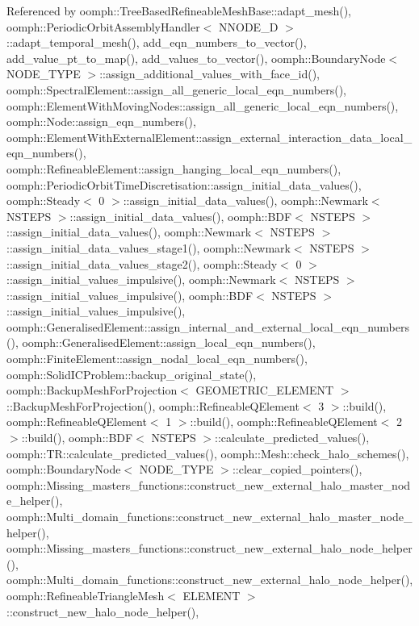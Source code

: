 Referenced by oomph\+::\+Tree\+Based\+Refineable\+Mesh\+Base\+::adapt\+\_\+mesh(), oomph\+::\+Periodic\+Orbit\+Assembly\+Handler$<$ N\+N\+O\+D\+E\+\_\+D $>$\+::adapt\+\_\+temporal\+\_\+mesh(), add\+\_\+eqn\+\_\+numbers\+\_\+to\+\_\+vector(), add\+\_\+value\+\_\+pt\+\_\+to\+\_\+map(), add\+\_\+values\+\_\+to\+\_\+vector(), oomph\+::\+Boundary\+Node$<$ N\+O\+D\+E\+\_\+\+T\+Y\+P\+E $>$\+::assign\+\_\+additional\+\_\+values\+\_\+with\+\_\+face\+\_\+id(), oomph\+::\+Spectral\+Element\+::assign\+\_\+all\+\_\+generic\+\_\+local\+\_\+eqn\+\_\+numbers(), oomph\+::\+Element\+With\+Moving\+Nodes\+::assign\+\_\+all\+\_\+generic\+\_\+local\+\_\+eqn\+\_\+numbers(), oomph\+::\+Node\+::assign\+\_\+eqn\+\_\+numbers(), oomph\+::\+Element\+With\+External\+Element\+::assign\+\_\+external\+\_\+interaction\+\_\+data\+\_\+local\+\_\+eqn\+\_\+numbers(), oomph\+::\+Refineable\+Element\+::assign\+\_\+hanging\+\_\+local\+\_\+eqn\+\_\+numbers(), oomph\+::\+Periodic\+Orbit\+Time\+Discretisation\+::assign\+\_\+initial\+\_\+data\+\_\+values(), oomph\+::\+Steady$<$ 0 $>$\+::assign\+\_\+initial\+\_\+data\+\_\+values(), oomph\+::\+Newmark$<$ N\+S\+T\+E\+P\+S $>$\+::assign\+\_\+initial\+\_\+data\+\_\+values(), oomph\+::\+B\+D\+F$<$ N\+S\+T\+E\+P\+S $>$\+::assign\+\_\+initial\+\_\+data\+\_\+values(), oomph\+::\+Newmark$<$ N\+S\+T\+E\+P\+S $>$\+::assign\+\_\+initial\+\_\+data\+\_\+values\+\_\+stage1(), oomph\+::\+Newmark$<$ N\+S\+T\+E\+P\+S $>$\+::assign\+\_\+initial\+\_\+data\+\_\+values\+\_\+stage2(), oomph\+::\+Steady$<$ 0 $>$\+::assign\+\_\+initial\+\_\+values\+\_\+impulsive(), oomph\+::\+Newmark$<$ N\+S\+T\+E\+P\+S $>$\+::assign\+\_\+initial\+\_\+values\+\_\+impulsive(), oomph\+::\+B\+D\+F$<$ N\+S\+T\+E\+P\+S $>$\+::assign\+\_\+initial\+\_\+values\+\_\+impulsive(), oomph\+::\+Generalised\+Element\+::assign\+\_\+internal\+\_\+and\+\_\+external\+\_\+local\+\_\+eqn\+\_\+numbers(), oomph\+::\+Generalised\+Element\+::assign\+\_\+local\+\_\+eqn\+\_\+numbers(), oomph\+::\+Finite\+Element\+::assign\+\_\+nodal\+\_\+local\+\_\+eqn\+\_\+numbers(), oomph\+::\+Solid\+I\+C\+Problem\+::backup\+\_\+original\+\_\+state(), oomph\+::\+Backup\+Mesh\+For\+Projection$<$ G\+E\+O\+M\+E\+T\+R\+I\+C\+\_\+\+E\+L\+E\+M\+E\+N\+T $>$\+::\+Backup\+Mesh\+For\+Projection(), oomph\+::\+Refineable\+Q\+Element$<$ 3 $>$\+::build(), oomph\+::\+Refineable\+Q\+Element$<$ 1 $>$\+::build(), oomph\+::\+Refineable\+Q\+Element$<$ 2 $>$\+::build(), oomph\+::\+B\+D\+F$<$ N\+S\+T\+E\+P\+S $>$\+::calculate\+\_\+predicted\+\_\+values(), oomph\+::\+T\+R\+::calculate\+\_\+predicted\+\_\+values(), oomph\+::\+Mesh\+::check\+\_\+halo\+\_\+schemes(), oomph\+::\+Boundary\+Node$<$ N\+O\+D\+E\+\_\+\+T\+Y\+P\+E $>$\+::clear\+\_\+copied\+\_\+pointers(), oomph\+::\+Missing\+\_\+masters\+\_\+functions\+::construct\+\_\+new\+\_\+external\+\_\+halo\+\_\+master\+\_\+node\+\_\+helper(), oomph\+::\+Multi\+\_\+domain\+\_\+functions\+::construct\+\_\+new\+\_\+external\+\_\+halo\+\_\+master\+\_\+node\+\_\+helper(), oomph\+::\+Missing\+\_\+masters\+\_\+functions\+::construct\+\_\+new\+\_\+external\+\_\+halo\+\_\+node\+\_\+helper(), oomph\+::\+Multi\+\_\+domain\+\_\+functions\+::construct\+\_\+new\+\_\+external\+\_\+halo\+\_\+node\+\_\+helper(), oomph\+::\+Refineable\+Triangle\+Mesh$<$ E\+L\+E\+M\+E\+N\+T $>$\+::construct\+\_\+new\+\_\+halo\+\_\+node\+\_\+helper(), 